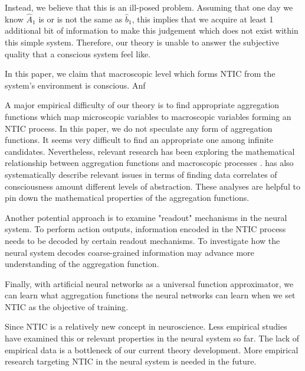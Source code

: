 \documentclass[utf8]{article}
\begin{document}
        Instead, we believe that this is an ill-posed problem. Assuming that one day we know $\hat{A}_1$ is or is not the same as $\hat{b}_1$, this implies that we acquire at least 1 additional bit of information to make this judgement which does not exist within this simple system. Therefore, our theory is unable to answer the subjective quality that a conscious system feel like. 
        
        
        
        In this paper, we claim that macroscopic level which forms NTIC from the system's environment is conscious. Anf
        
        
    
        A major empirical difficulty of our theory is to find appropriate aggregation functions which map microscopic variables to macroscopic variables forming an NTIC process. In this paper, we do not speculate any form of aggregation functions. It seems very difficult to find an appropriate one among infinite candidates\citep{price2007causation}. Nevertheless, relevant research has been exploring the mathematical relationship between aggregation functions and macroscopic processes \citep{PFANTE.2014}. \cite{Gamez2016} has also
        systematically describe relevant issues in terms of finding data correlates of consciousness amount different levels of abstraction. These analyses are helpful to pin down the mathematical properties of the aggregation functions. 
        
        Another potential approach is to examine "readout" mechanisms in the neural system. To perform action outputs, information encoded in the NTIC process needs to be decoded by certain readout mechanisms. To investigate how the neural system decodes coarse-grained information may advance more understanding of the aggregation function. 
        
        Finally, with artificial neural networks as a universal function approximator, we can learn what aggregation functions the neural networks can learn when we set NTIC as the objective of training. 
        
        Since NTIC is a relatively new concept in neuroscience. Less empirical studies have examined this or relevant properties in the neural system so far. The lack of empirical data is a bottleneck of our current theory development. More empirical research targeting NTIC in the neural system is needed in the future. 
		
\end{document}
